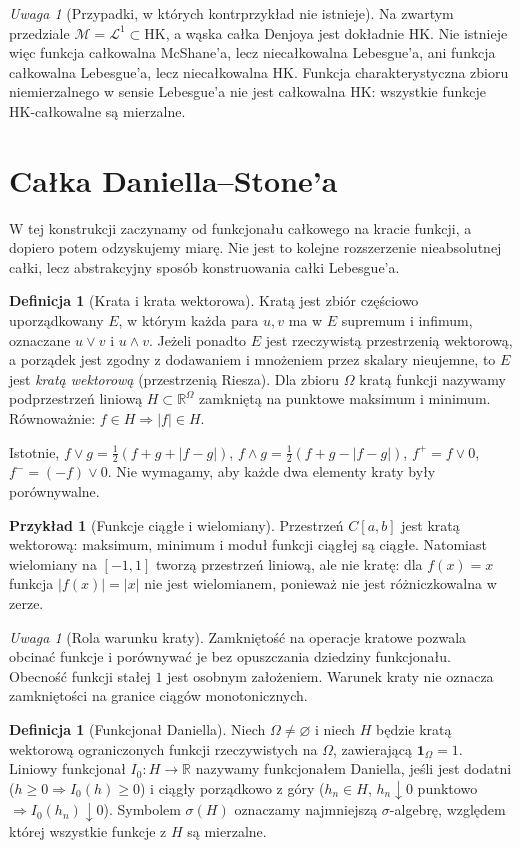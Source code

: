 \documentclass[11pt,a4paper]{article}
\numberwithin{equation}{section}
\theoremstyle{plain}
\theoremstyle{definition}
\newtheorem{definicja}[twierdzenie]{Definicja}
\newtheorem{przyklad}[twierdzenie]{Przykład}
\theoremstyle{remark}
\newtheorem{uwaga}[twierdzenie]{Uwaga}
\newcommand{\R}{\mathbb R}
\newcommand{\ind}[1]{\mathbf 1_{#1}}
\newcommand{\HK}{\mathrm{HK}}
\begin{document}
\begin{uwaga}[Przypadki, w których kontrprzykład nie istnieje]
Na zwartym przedziale $\mathcal M=\mathcal L^1\subset\HK$, a wąska całka Denjoya jest dokładnie HK. Nie istnieje więc funkcja całkowalna McShane'a, lecz niecałkowalna Lebesgue'a, ani funkcja całkowalna Lebesgue'a, lecz niecałkowalna HK. Funkcja charakterystyczna zbioru niemierzalnego w sensie Lebesgue'a nie jest całkowalna HK: wszystkie funkcje HK-całkowalne są mierzalne.
\end{uwaga}

\section{Całka Daniella--Stone'a}
W tej konstrukcji zaczynamy od funkcjonału całkowego na kracie funkcji, a dopiero potem odzyskujemy miarę. Nie jest to kolejne rozszerzenie nieabsolutnej całki, lecz abstrakcyjny sposób konstruowania całki Lebesgue'a.
\begin{definicja}[Krata i krata wektorowa]
Kratą jest zbiór częściowo uporządkowany $E$, w którym każda para $u,v$ ma w $E$ supremum i infimum, oznaczane $u\vee v$ i $u\wedge v$. Jeżeli ponadto $E$ jest rzeczywistą przestrzenią wektorową, a porządek jest zgodny z dodawaniem i mnożeniem przez skalary nieujemne, to $E$ jest \emph{kratą wektorową} (przestrzenią Riesza). Dla zbioru $\Omega$ kratą funkcji nazywamy podprzestrzeń liniową $H\subset\R^\Omega$ zamkniętą na punktowe maksimum i minimum. Równoważnie: $f\in H\Rightarrow|f|\in H$.
\end{definicja}
Istotnie, $f\vee g=\tfrac12(f+g+|f-g|)$, $f\wedge g=\tfrac12(f+g-|f-g|)$, $f^+=f\vee0$, $f^-=(-f)\vee0$. Nie wymagamy, aby każde dwa elementy kraty były porównywalne.
\begin{przyklad}[Funkcje ciągłe i wielomiany]
Przestrzeń $C[a,b]$ jest kratą wektorową: maksimum, minimum i moduł funkcji ciągłej są ciągłe. Natomiast wielomiany na $[-1,1]$ tworzą przestrzeń liniową, ale nie kratę: dla $f(x)=x$ funkcja $|f(x)|=|x|$ nie jest wielomianem, ponieważ nie jest różniczkowalna w zerze.
\end{przyklad}
\begin{uwaga}[Rola warunku kraty]
Zamkniętość na operacje kratowe pozwala obcinać funkcje i porównywać je bez opuszczania dziedziny funkcjonału. Obecność funkcji stałej $1$ jest osobnym założeniem. Warunek kraty nie oznacza zamkniętości na granice ciągów monotonicznych.
\end{uwaga}
\begin{definicja}[Funkcjonał Daniella]
Niech $\Omega\ne\varnothing$ i niech $H$ będzie kratą wektorową ograniczonych funkcji rzeczywistych na $\Omega$, zawierającą $\ind\Omega=1$. Liniowy funkcjonał $I_0:H\to\R$ nazywamy funkcjonałem Daniella, jeśli jest dodatni ($h\ge0\Rightarrow I_0(h)\ge0$) i ciągły porządkowo z góry ($h_n\in H$, $h_n\downarrow0$ punktowo $\Rightarrow I_0(h_n)\downarrow0$). Symbolem $\sigma(H)$ oznaczamy najmniejszą $\sigma$-algebrę, względem której wszystkie funkcje z $H$ są mierzalne.
\end{definicja}
\end{document}
